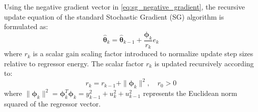 Using the negative gradient vector in \eqref{eq:sg_negative_gradient}, the recursive update equation of the standard Stochastic Gradient (SG) algorithm is formulated as:
\begin{equation}
\hat{\boldsymbol{\theta}}_k = \hat{\boldsymbol{\theta}}_{k-1} + \frac{\boldsymbol{\phi}_k}{r_k} e_k
\label{eq:sg_recursion_standard}
\end{equation}
where $r_k$ is a scalar gain scaling factor introduced to normalize update step sizes relative to regressor energy. The scalar factor $r_k$ is updated recursively according to:
\begin{equation}
r_k = r_{k-1} + \|\boldsymbol{\phi}_k\|^2, \quad r_0 > 0
\label{eq:sg_r_scaling_standard}
\end{equation}
where $\|\boldsymbol{\phi}_k\|^2 = \boldsymbol{\phi}_k^T \boldsymbol{\phi}_k = y_{k-1}^2 + u_k^2 + u_{k-1}^2$ represents the Euclidean norm squared of the regressor vector.


